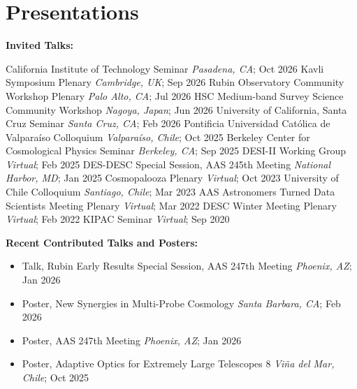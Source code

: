 \section{Presentations}

\textbf{Invited Talks:}
\begin{itemize}
    \talk California Institute of Technology Seminar \hfill \textit{Pasadena, CA}; Oct 2026
    \talk Kavli Symposium Plenary \hfill \textit{Cambridge, UK}; Sep 2026
    \talk Rubin Observatory Community Workshop Plenary \hfill \textit{Palo Alto, CA}; Jul 2026
    \talk HSC Medium-band Survey Science Community Workshop \hfill \textit{Nagoya, Japan}; Jun 2026
    \talk University of California, Santa Cruz Seminar \hfill \textit{Santa Cruz, CA}; Feb 2026
    \talk Pontificia Universidad Católica de Valparaíso Colloquium \hfill \textit{Valpara\'iso, Chile}; Oct 2025
    \talk Berkeley Center for Cosmological Physics Seminar \hfill \textit{Berkeley, CA}; Sep 2025
    \talk DESI-II Working Group \hfill \textit{Virtual}; Feb 2025
    \talk DES-DESC Special Session, AAS 245th Meeting \hfill \textit{National Harbor, MD}; Jan 2025
    \talk Cosmopalooza Plenary \hfill \textit{Virtual}; Oct 2023
    \talk University of Chile Colloquium \hfill \textit{Santiago, Chile}; Mar 2023
    \talk AAS Astronomers Turned Data Scientists Meeting Plenary \hfill \textit{Virtual}; Mar 2022
    \talk DESC Winter Meeting Plenary \hfill \textit{Virtual}; Feb 2022
    \talk KIPAC Seminar \hfill \textit{Virtual}; Sep 2020
\end{itemize}

\textbf{Recent Contributed Talks and Posters:}
\begin{itemize}
    \item Talk, Rubin Early Results Special Session, AAS 247th Meeting \hfill \textit{Phoenix, AZ}; Jan 2026
    \item Poster, New Synergies in Multi-Probe Cosmology \hfill \textit{Santa Barbara, CA}; Feb 2026
    \item Poster, AAS 247th Meeting \hfill \textit{Phoenix, AZ}; Jan 2026
    \item Poster, Adaptive Optics for Extremely Large Telescopes 8 \hfill \textit{Vi\~{n}a del Mar, Chile}; Oct 2025
\end{itemize}


